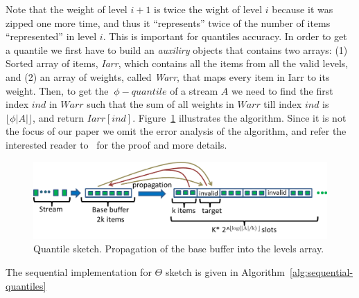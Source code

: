 Note that the weight of level $i+1$ is twice the wight of level
$i$ because it was zipped one more time, and thus it
``represents'' twice of the number of items ``represented'' in
level $i$.
This is important for quantiles accuracy.
In order to get a quantile we first have to build an
\emph{auxiliry} objects that contains two arrays:
(1) Sorted array of items, \emph{Iarr}, which 
contains all the items from all the valid levels, and (2) an
array of weights, called \emph{Warr}, that maps every item in
Iarr to its weight.
Then, to get the $~\phi - quantile$ of a stream $A$
we need to find the first index $ind$ in $Warr$ such that the
sum of all weights in $Warr$ till index $ind$ is $\lfloor \phi |A|
\rfloor$, and return $Iarr[ind]$.
Figure~\ref{fig:quantilesMerge} illustrates the algorithm.
Since it is not the focus of our paper we omit the error analysis
of the algorithm, and refer the interested reader to~\cite{} for
the proof and more details.

\begin{figure}[H]
    \centering
    \includegraphics[width=5in]{images/quantilesPropogation.png}
    \caption{Quantile sketch. Propagation of the base buffer
    into the levels array.}
    \label{fig:quantilesMerge}
\end{figure}

The sequential implementation for $\Theta$ sketch is given in Algorithm~\ref{alg:sequential-quantiles}

